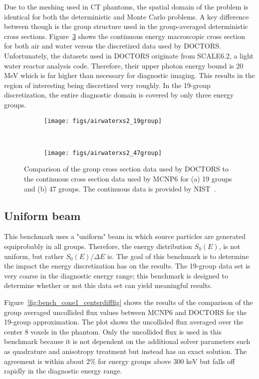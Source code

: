 Due to the meshing used in CT phantoms, the spatial domain of the problem is identical for both the deterministic and Monte Carlo problems. A key difference between though is the group structure used in the group-averaged deterministic cross sections. Figure~\ref{fig:airwaterxs} shows the continuous energy macroscopic cross section for both air and water versus the discretized data used by DOCTORS. Unfortunately, the datasets used in DOCTORS originate from SCALE6.2, a light water reactor analysis code. Therefore, their upper photon energy bound is 20 MeV which is far higher than necessary for diagnostic imaging. This results in the region of interesting being discretized very roughly. In the 19-group discretization, the entire diagnostic domain is covered by only three energy groups.

\begin{figure}
    \centering
    \begin{subfigure}[b]{0.45\textwidth}
        \texttt{[image: figs/airwaterxs2\_19group]}
        \caption{}
        \label{fig:airwaterxs19}
    \end{subfigure}
    ~
    \begin{subfigure}[b]{0.45\textwidth}
        \texttt{[image: figs/airwaterxs2\_47group]}
        \caption{}
        \label{fig:airwaterxs47}
    \end{subfigure}
    \caption{Comparison of the group cross section data used by DOCTORS to the continuous cross section data used by MCNP6 for (a) 19 groups and (b) 47 groups. The continuous data is provided by NIST~\citep{ref:hubbellj}.}\label{fig:airwaterxs}
\end{figure}

\subsection{Uniform beam}

This benchmark uses a "uniform" beam in which source particles are generated equiprobably in all groups. Therefore, the energy distribution $S_0(E)$, is not uniform, but rather $S_0(E)/\Delta E$ is. The goal of this benchmark is to determine the impact the energy discretization has on the results. The 19-group data set is very coarse in the diagnostic energy range; this benchmark is designed to determine whether or not this data set can yield meaningful results.

Figure~\ref{fig:bench_cone1_centerdifffig} shows the results of the comparison of the group averaged uncollided flux values between MCNP6 and DOCTORS for the 19-group approximation. The plot shows the uncollided flux averaged over the center 8 voxels in the phantom. Only the uncollided flux is used in this benchmark because it is not dependent on the additional solver parameters such as quadrature and anisotropy treatment but instead has an exact solution. The agreement is within about 2\% for energy groups above 300 keV but falls off rapidly in the diagnostic energy range.

